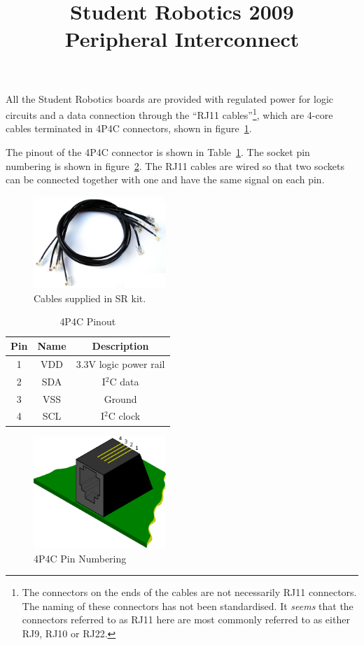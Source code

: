 \documentclass[a4paper,twocolumn]{article}
\title{Student Robotics 2009\\ Peripheral Interconnect}
\newcommand{\itwoc}{I$^2$C }
\begin{document}
\maketitle

All the Student Robotics boards are provided with regulated power for logic circuits and a data connection through the ``RJ11 cables''\footnote{The connectors on the ends of the cables are not necessarily RJ11 connectors.  The naming of these connectors has not been standardised.  It \emph{seems} that the connectors referred to as RJ11 here are most commonly referred to as either RJ9, RJ10 or RJ22.}, which are 4-core cables terminated in 4P4C connectors, shown in figure~\ref{fig:coil}.

The pinout of the 4P4C connector is shown in Table~\ref{tab:4p4c-pinout}.  The socket pin numbering is shown in figure~\ref{fig:4p4c-pin-num}.  The RJ11 cables are wired so that two sockets can be connected together with one and have the same signal on each pin.

\begin{figure}
  \begin{center}
    \includegraphics[width=5cm]{./images/coil.jpg}
  \end{center}
  \caption{\label{fig:coil}Cables supplied in SR kit.}
\end{figure}

\begin{table}
  \caption{\label{tab:4p4c-pinout}4P4C Pinout}

  \begin{center}
    \begin{tabular}{|c|c|c|}
      \hline
      \textbf{Pin} & \textbf{Name} & \textbf{Description} \\
      \hline
      1 & VDD & 3.3V logic power rail\\
      2 & SDA & \itwoc data \\
      3 & VSS & Ground \\
      4 & SCL & \itwoc clock\\
      \hline
    \end{tabular}
  \end{center}
\end{table}


\begin{figure}
  \begin{center}
    \includegraphics[width=5cm]{./images/4p4c.pdf}
  \end{center}
  \caption{\label{fig:4p4c-pin-num}4P4C Pin Numbering}
\end{figure}
\end{document}
